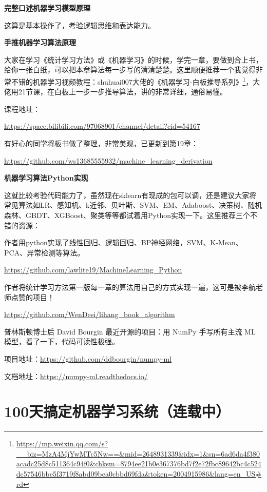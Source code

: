 \documentclass[]{ctexbook}
\renewcommand{\href}[2]{#2\footnote{\url{#1}}}
\begin{document}
\textbf{完整口述机器学习模型原理}

这算是基本操作了，考验逻辑思维和表达能力。

\textbf{手推机器学习算法原理}

大家在学习《统计学习方法》或《机器学习》的时候，学完一章，要做到合上书，给你一张白纸，可以把本章算法每一步写的清清楚楚。这里顺便推荐一个我觉得非常不错的机器学习视频教程：\href{https://mp.weixin.qq.com/s?__biz=MzA4MjYwMTc5Nw==\&mid=2648931339\&idx=1\&sn=6ad6da4f380acadc25d8c511364c94f0\&chksm=8794ee21b0e367376bd7f2e72fbc89642bc4c524dc57546bbe5f3719f8abd09bea0cbbd69fda\&token=2004915986\&lang=en_US\#rd}{shuhuai007大佬的《机器学习-白板推导系列》}，大佬用21节课，在白板上一步一步推导算法，讲的非常详细，通俗易懂。

课程地址：

\url{https://space.bilibili.com/97068901/channel/detail?cid=54167}

有好心的同学将板书做了整理，非常美观，已更新到第19章：

\url{https://github.com/ws13685555932/machine_learning_derivation}

\textbf{机器学习算法Python实现}

这就比较考验代码能力了，虽然现在sklearn有现成的包可以调，还是建议大家将常见算法如LR、感知机、k近邻、贝叶斯、SVM、EM、Adaboost、决策树、随机森林、GBDT、XGBoost、聚类等等都试着用Python实现一下。这里推荐三个不错的资源：

作者用python实现了线性回归、逻辑回归、BP神经网络，SVM、K-Mean、PCA、异常检测等算法。

\url{https://github.com/lawlite19/MachineLearning_Python}

作者将统计学习方法第一版每一章的算法用自己的方式实现一遍，这可是被李航老师点赞的项目！

\url{https://github.com/WenDesi/lihang_book_algorithm}

普林斯顿博士后 David Bourgin 最近开源的项目：用 NumPy 手写所有主流 ML 模型，看了一下，代码可读性极强。

项目地址：\url{https://github.com/ddbourgin/numpy-ml}

文档地址：\url{https://numpy-ml.readthedocs.io/}

\hypertarget{ux5929ux641eux5b9aux673aux5668ux5b66ux4e60ux7cfbux7edfux8fdeux8f7dux4e2d}{%
\section{100天搞定机器学习系统（连载中）}\label{ux5929ux641eux5b9aux673aux5668ux5b66ux4e60ux7cfbux7edfux8fdeux8f7dux4e2d}}
\end{document}
